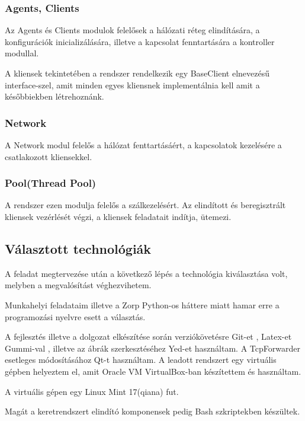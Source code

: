 \documentclass[a4paper,12pt,oneside]{report}
\begin{document}
\subsubsection{Agents, Clients}

Az Agents és Clients modulok felelősek a hálózati réteg elindítására, a konfigurációk inicializálására, illetve a kapcsolat fenntartására a kontroller modullal.

A kliensek tekintetében a rendszer rendelkezik egy BaseClient elnevezésű interface-szel, amit minden egyes kliensnek implementálnia kell amit a későbbiekben létrehoznánk.

\subsubsection{Network}
A Network modul felelős a hálózat fenttartásáért, a kapcsolatok kezelésére a csatlakozott kliensekkel.
    
\subsubsection{Pool(Thread Pool)}

A rendszer ezen modulja felelős a szálkezelésért.
Az elindított és beregisztrált kliensek vezérlését végzi, a kliensek feladatait indítja, ütemezi.

\subsection{Választott technológiák}

A feladat megtervezése után a következő lépés a technológia kiválasztása volt, melyben a megvalósítást véghezvihetem.

Munkahelyi feladataim illetve a Zorp Python-os háttere miatt hamar erre a programozási nyelvre esett a választás.

A fejlesztés illetve a dolgozat elkészítése során verziókövetésre Git-et \cite{website:git}, Latex-et Gummi-val \cite{website:gummi}, illetve az ábrák szerkesztéséhez Yed-et \cite{website:yed} használtam.
A TcpForwarder esetleges módosításához Qt-t \cite{website:qt} használtam.
A leadott rendszert egy virtuális gépben helyeztem el, amit Oracle VM VirtualBox-ban készítettem és használtam. \cite{website:vbox}

A virtuális gépen egy Linux Mint 17(qiana) fut. \cite{website:linuxmint}

Magát a keretrendszert elindító komponensek pedig Bash szkriptekben készültek.
\end{document}
